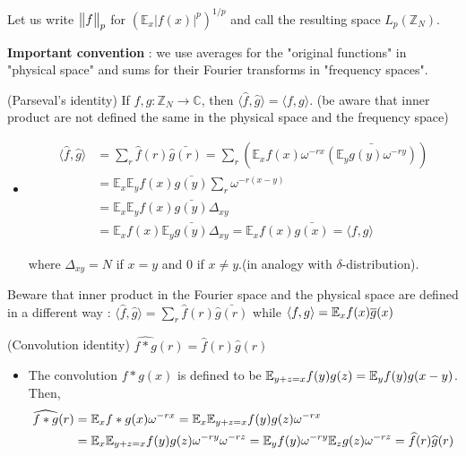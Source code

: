 \documentclass[10pt,a4paper]{report}
\renewcommand{\hat}{\widehat}
\begin{document}
Let us write $\bigl\lVert f\bigr\rVert_{p}$ for $(\mathbb{E}_x |f(x)|^p)^{1/p}$ and call the resulting space $L_p(\mathbb{Z}_N)$.
\s

\textbf{Important convention} : we use averages for the "original functions" in "physical space" and sums for their Fourier transforms in "frequency spaces".
\s

 (Parseval's identity) If $f,g:\mathbb{Z}_N \rightarrow \mathbb{C}$, then $\langle \hat{f},\hat{g}\rangle =\langle f,g\rangle$. (be aware that inner product are not defined the same in the physical space and the frequency space)
\begin{itemize}
\item[ ] \pf
\begin{align*}
\langle \hat{f},\hat{g} \rangle &= \sum_{r} \hat{f}(r) \bar{\hat{g}(r)} = \sum_r (\mathbb{E}_x f(x)\omega^{-rx} \bar{(\mathbb{E}_y g(y) \omega^{-ry})} ) \\
&= \mathbb{E}_x \mathbb{E}_y f(x)\bar{g(y)} \sum_r \omega^{-r(x-y)} \\
&= \mathbb{E}_x \mathbb{E}_y f(x)\bar{g(y)} \Delta_{xy}\\
&=  \mathbb{E}_x f(x) \mathbb{E}_y \bar{g(y)} \Delta_{xy} = \mathbb{E}_x f(x)\bar{g(x)} = \langle f,g \rangle
\end{align*}

where $\Delta_{xy} = N$ if $x=y$ and $0$ if $x\neq y$.(in analogy with $\delta$-distribution).

\eop
\end{itemize}
\s

Beware that inner product in the Fourier space and the physical space are defined in a different way : $\langle \hat{f},\hat{g} \rangle = \sum_{r} \hat{f}(r) \bar{\hat{g}(r)}$ while $\langle f,g\rangle = \mathbb{E}_x f(x) \overline{g}(x)$
\s

(Convolution identity) $\hat{f * g}(r) = \hat{f}(r) \hat{g}(r)$

\begin{itemize}
\item[ ]\pf The convolution $f*g(x)$ is defined to be $\mathbb{E}_{y+z =x} f(y) g(z) = \mathbb{E}_y f(y)g(x-y)$. Then,
\begin{align*}
\hat{f * g}(r) &= \avg_x f*g(x) \omega^{-rx} = \avg_x \avg_{y+z =x} f(y) g(z) \omega^{-rx} \\
&= \avg_x \avg_{y+z=x} f(y) g(z) \omega^{-ry}\omega^{-rz} = \avg_y f(y) \omega^{-ry} \avg_{z} g(z) \omega^{-rz} = \hat{f}(r) \hat{g}(r)
\end{align*}
\eop
\end{itemize} 
\s
\end{document}
